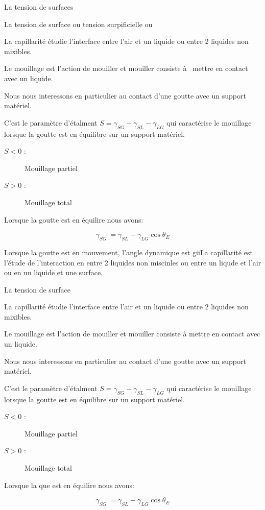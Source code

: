 \documentclass[french]{article}
\begin{document}
\begin{figure}
	
\end{figure}
La tension de surfaces

La tension de surface ou tension surpificielle ou

La capillarité étudie l'interface entre l'air et un liquide ou entre 2 liquides
non mixibles.

Le mouillage est l'action de mouiller et mouiller consiste à  mettre en contact avec un liquide.

Nous nous interessons en particulier au contact d'une goutte avec un support matériel.

C'est le paramètre d'étalment $S = \gamma_{SG} - \gamma_{SL} - \gamma_{LG}$ qui caractérise le mouillage lorsque la goutte est en équilibre sur un support matériel.

\begin{description}
\item[$S < 0$ :] Mouillage partiel
\item[$S > 0$ :] Mouillage total
\end{description}

Lorsque la goutte est en équilire nous avons:

\[\gamma_{SG}\ = \gamma_{SL} - \gamma_{LG}\cos\theta_{E}\]

Lorsque la goutte est en mouvement, l'angle dynamique  est giiLa capillarité est l'étude de l'interaction en entre 2 liquides non miscinles ou entre un liqude et l'air ou en un liquide et une surface.

La tension de surface 

La capillarité étudie l'interface entre l'air et un liquide ou entre 2 liquides
non mixibles.

Le mouillage est l'action de mouiller et mouiller consiste à mettre en contact avec un liquide.

Nous nous interessons en particulier au contact d'une goutte avec un support matériel.

C'est le paramètre d'étalment $S = \gamma_{SG} - \gamma_{SL} - \gamma_{LG}$ qui caractérise le mouillage lorsque la goutte est en équilibre sur un support matériel.

\begin{description}
\item[$S < 0$ :] Mouillage partiel
\item[$S > 0$ :] Mouillage total
\end{description}

Lorsque la que est en équilire nous avons:

\[\gamma_{SG}\ = \gamma_{SL} - \gamma_{LG}\cos\theta_{E} \]

\begin{figure}
	
\end{figure}
\end{document}
